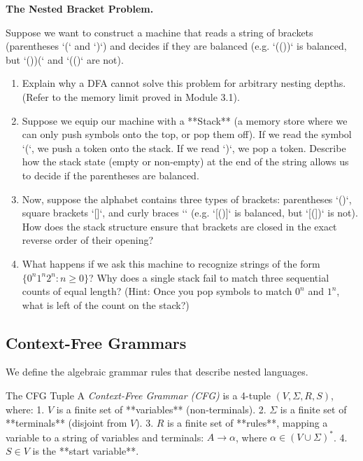 \documentclass[12pt, a4paper]{book}
\newcommand{\newterm}[1]{\textit{\textcolor{DiscoveryColor}{#1}}}
\begin{document}
\begin{puzzlebox}
\textbf{The Nested Bracket Problem.}

Suppose we want to construct a machine that reads a string of brackets (parentheses `(` and `)`) and decides if they are balanced (e.g. `(())` is balanced, but `())(` and `(()` are not).
\begin{enumerate}[label=(\alph*), leftmargin=*]
  \item Explain why a DFA cannot solve this problem for arbitrary nesting depths. (Refer to the memory limit proved in Module 3.1).
  \item Suppose we equip our machine with a **Stack** (a memory store where we can only push symbols onto the top, or pop them off).
        If we read the symbol `(`, we push a token onto the stack. If we read `)`, we pop a token.
        Describe how the stack state (empty or non-empty) at the end of the string allows us to decide if the parentheses are balanced.
  \item Now, suppose the alphabet contains three types of brackets: parentheses `()`, square brackets `[]`, and curly braces `{}` (e.g. `{[()]}` is balanced, but `[(])` is not).
        How does the stack structure ensure that brackets are closed in the exact reverse order of their opening?
  \item What happens if we ask this machine to recognize strings of the form $\{0^n 1^n 2^n : n \ge 0\}$?
        Why does a single stack fail to match three sequential counts of equal length? (Hint: Once you pop symbols to match $0^n$ and $1^n$, what is left of the count on the stack?)
\end{enumerate}
\end{puzzlebox}

\subsection{Context-Free Grammars}

We define the algebraic grammar rules that describe nested languages.

\begin{namedconcept}{The CFG Tuple}
A \newterm{Context-Free Grammar (CFG)} is a 4-tuple $(V, \Sigma, R, S)$, where:
1. $V$ is a finite set of **variables** (non-terminals).
2. $\Sigma$ is a finite set of **terminals** (disjoint from $V$).
3. $R$ is a finite set of **rules**, mapping a variable to a string of variables and terminals: $A \to \alpha$, where $\alpha \in (V \cup \Sigma)^*$.
4. $S \in V$ is the **start variable**.
\end{namedconcept}
\end{document}
